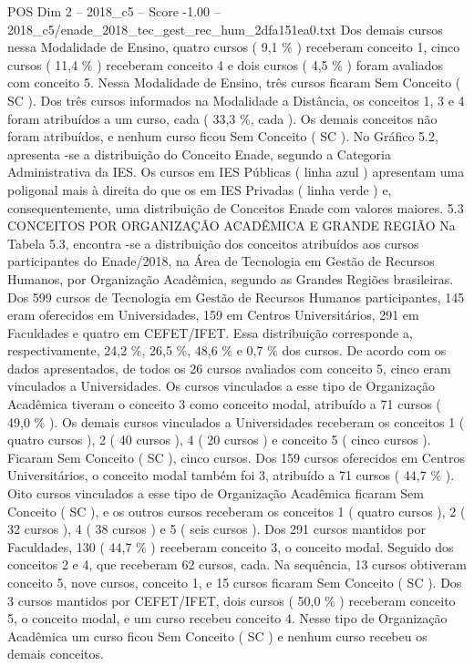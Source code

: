 \begin{textsample}{POS Dim 2 – 2018\_c5 – Score -1.00 – 2018\_c5/enade\_2018\_tec\_gest\_rec\_hum\_2dfa151ea0.txt}
Dos demais cursos nessa Modalidade de Ensino, quatro cursos ( 9,1 \% ) receberam conceito 1, cinco cursos ( 11,4 \% ) receberam conceito 4 e dois cursos ( 4,5 \% ) foram avaliados com conceito 5.
Nessa Modalidade de Ensino, três cursos ficaram Sem Conceito ( SC ).
Dos três cursos informados na Modalidade a Distância, os conceitos 1, 3 e 4 foram atribuídos a um curso, cada ( 33,3 \%, cada ).
Os demais conceitos não foram atribuídos, e nenhum curso ficou Sem Conceito ( SC ).
No Gráfico 5.2, apresenta -se a distribuição do Conceito Enade, segundo a Categoria Administrativa da IES.
Os cursos em IES Públicas ( linha azul ) apresentam uma poligonal mais à direita do que os em IES Privadas ( linha verde ) e, consequentemente, uma distribuição de Conceitos Enade com valores maiores. 5.3 CONCEITOS POR ORGANIZAÇÃO ACADÊMICA E GRANDE REGIÃO Na Tabela 5.3, encontra -se a distribuição dos conceitos atribuídos aos cursos participantes do Enade/2018, na Área de Tecnologia em Gestão de Recursos Humanos, por Organização Acadêmica, segundo as Grandes Regiões brasileiras.
Dos 599 cursos de Tecnologia em Gestão de Recursos Humanos participantes, 145 eram oferecidos em Universidades, 159 em Centros Universitários, 291 em Faculdades e quatro em CEFET/IFET.
Essa distribuição corresponde a, respectivamente, 24,2 \%, 26,5 \%, 48,6 \% e 0,7 \% dos cursos.
De acordo com os dados apresentados, de todos os 26 cursos avaliados com conceito 5, cinco eram vinculados a Universidades.
Os cursos vinculados a esse tipo de Organização Acadêmica tiveram o conceito 3 como conceito modal, atribuído a 71 cursos ( 49,0 \% ).
Os demais cursos vinculados a Universidades receberam os conceitos 1 ( quatro cursos ), 2 ( 40 cursos ), 4 ( 20 cursos ) e conceito 5 ( cinco cursos ).
Ficaram Sem Conceito ( SC ), cinco cursos.
Dos 159 cursos oferecidos em Centros Universitários, o conceito modal também foi 3, atribuído a 71 cursos ( 44,7 \% ).
Oito cursos vinculados a esse tipo de Organização Acadêmica ficaram Sem Conceito ( SC ), e os outros cursos receberam os conceitos 1 ( quatro cursos ), 2 ( 32 cursos ), 4 ( 38 cursos ) e 5 ( seis cursos ).
Dos 291 cursos mantidos por Faculdades, 130 ( 44,7 \% ) receberam conceito 3, o conceito modal.
Seguido dos conceitos 2 e 4, que receberam 62 cursos, cada.
Na sequência, 13 cursos obtiveram conceito 5, nove cursos, conceito 1, e 15 cursos ficaram Sem Conceito ( SC ).
Dos 3 cursos mantidos por CEFET/IFET, dois cursos ( 50,0 \% ) receberam conceito 5, o conceito modal, e um curso recebeu conceito 4.
Nesse tipo de Organização Acadêmica um curso ficou Sem Conceito ( SC ) e nenhum curso recebeu os demais conceitos.

\end{textsample}
